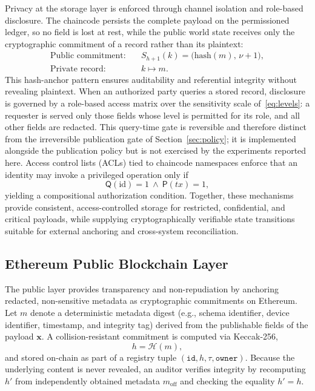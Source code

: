\documentclass[final,5p,times,twocolumn]{elsarticle}
\begin{document}
Privacy at the storage layer is enforced through channel isolation and role-based disclosure. The chaincode persists the complete payload on the permissioned ledger, so no field is lost at rest, while the public world state receives only the cryptographic commitment of a record rather than its plaintext:
\begin{subequations}
\begin{align}
\text{Public commitment:} \quad
  &S_{h+1}(k)=\big(\mathrm{hash}(m),\,\nu{+}1\big), \label{eq:public_hash} \\
\text{Private record:} \quad
  &k \mapsto m. \label{eq:private_record}
\end{align}
\end{subequations}
This hash-anchor pattern ensures auditability and referential integrity without revealing plaintext. When an authorized party queries a stored record, disclosure is governed by a role-based access matrix over the sensitivity scale of~\eqref{eq:levels}: a requester is served only those fields whose level is permitted for its role, and all other fields are redacted. This query-time gate is reversible and therefore distinct from the irreversible publication gate of Section~\ref{sec:policy}; it is implemented alongside the publication policy but is not exercised by the experiments reported here. Access control lists (ACLs) tied to chaincode namespaces enforce that an identity may invoke a privileged operation only if
\begin{equation}
\mathsf{Q}(\mathrm{id})=1 \ \land\ \mathsf{P}(tx)=1,
\label{eq:auth_cond}
\end{equation}
yielding a compositional authorization condition. Together, these mechanisms provide consistent, access-controlled storage for restricted, confidential, and critical payloads, while supplying cryptographically verifiable state transitions suitable for external anchoring and cross-system reconciliation.

\subsection{\textbf{Ethereum Public Blockchain Layer}}
\label{sec:eth}

The public layer provides transparency and non-repudiation by anchoring redacted, non-sensitive metadata as cryptographic commitments on Ethereum. Let $m$ denote a deterministic metadata digest (e.g., schema identifier, device identifier, timestamp, and integrity tag) derived from the publishable fields of the payload $\mathbf{x}$. A collision-resistant commitment is computed via Keccak-256,
\begin{equation}
  h = \mathcal{H}(m),
  \label{eq:eth_hash}
\end{equation}
and stored on-chain as part of a registry tuple $(\texttt{id},h,\tau,\texttt{owner})$. Because the underlying content is never revealed, an auditor verifies integrity by recomputing $h'$ from independently obtained metadata $m_{\text{off}}$ and checking the equality $h'=h$.
\end{document}
